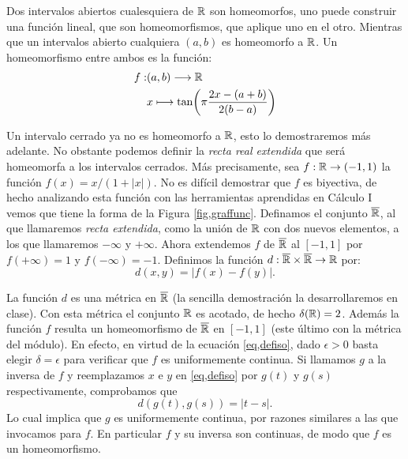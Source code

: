 \begin{ejemplo}{} Dos intervalos abiertos cualesquiera de $\mathbb{R}$ son
homeomorfos, uno puede construir una función lineal, que son
homeomorfismos, que aplique uno en el otro. Mientras que un
intervalos abierto  cualquiera $(a,b)$ es homeomorfo a $\mathbb{R}$. Un
homeomorfismo entre ambos es la función:
\[
    \begin{split}
        f:&(a,b)\longrightarrow\mathbb{R}\\
          &x\longmapsto
          \text{tan}\biggl(\pi\frac{2x-(a+b)}{2(b-a)}\biggr)
    \end{split}
\]
\end{ejemplo}

\begin{ejemplo}{}Un intervalo cerrado ya no es homeomorfo a $\mathbb{R}$,
esto lo demostraremos más adelante. No obstante podemos definir
la \emph{recta real extendida} que será homeomorfa a los
intervalos cerrados. Más precisamente, sea $f:\mathbb{R}\rightarrow
(-1,1)$ la función $f(x)=x/(1+|x|)$. No es difícil demostrar
que $f$ es biyectiva, de hecho analizando esta función con las
herramientas aprendidas en Cálculo I vemos que tiene la forma de
la Figura \vref{fig,graffunc}. Definamos el conjunto
$\overline{\mathbb{R}}$, al que llamaremos \emph{recta extendida}, como
la unión de $\mathbb{R}$ con dos nuevos elementos, a los que llamaremos
$-\infty$ y $+\infty$. Ahora extendemos $f$ de $\overline{\mathbb{R}}$ al
$[-1,1]$ por $f(+\infty)=1$ y $f(-\infty)=-1$. Definimos la
función $d:\overline{\mathbb{R}}\times\overline{\mathbb{R}}\rightarrow \mathbb{R}$
por: \begin{equation}\label{eq,defiso}
    d(x,y)=|f(x)-f(y)|.
\end{equation}


La función $d$ es una métrica en $\overline{\mathbb{R}}$ (la sencilla
demostración la desarrollaremos en clase). Con esta métrica el
conjunto $\mathbb{R}$ es acotado, de hecho $\delta(\mathbb{R})=2$. Además la
función $f$ resulta un homeomorfismo de $\overline{\mathbb{R}}$ en
$[-1,1]$ (este último con la métrica del módulo). En efecto,
en virtud de la ecuación \vref{eq,defiso}, dado $\epsilon>0$
basta elegir $\delta=\epsilon$ para verificar que $f$ es
uniformemente continua. Si llamamos $g$ a la inversa de $f$ y
reemplazamos $x$ e $y$ en \vref{eq,defiso} por $g(t)$ y $g(s)$
respectivamente, comprobamos que
\begin{equation}\label{eq,defisoinv}
    d(g(t),g(s))=|t-s|.
\end{equation}
Lo cual implica que $g$ es uniformemente continua, por razones
similares a las que invocamos para $f$. En particular $f$ y su
inversa son continuas, de modo que $f$ es un homeomorfismo.


\end{ejemplo}


